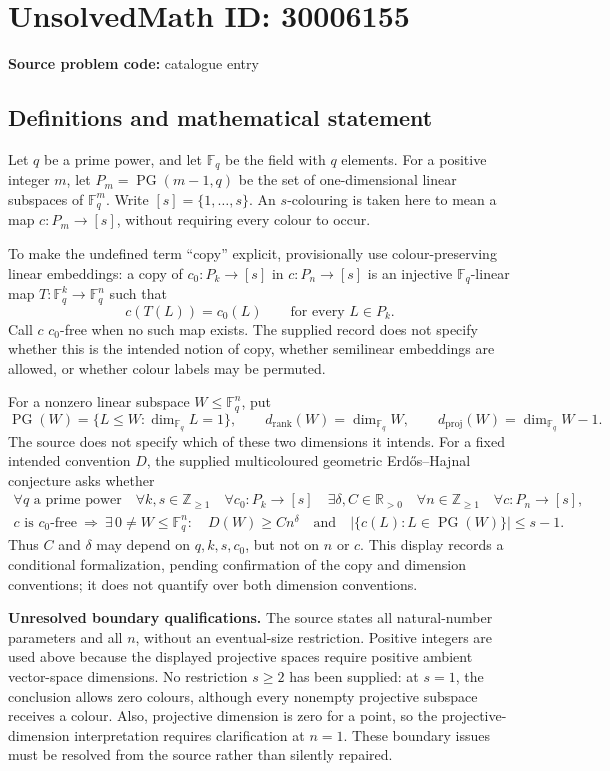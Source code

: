 \documentclass[11pt]{article}
\newcommand{\Z}{\mathbb{Z}}
\newcommand{\R}{\mathbb{R}}
\newcommand{\F}{\mathbb{F}}
\begin{document}
\section*{UnsolvedMath ID: 30006155}
\textbf{Source problem code:} catalogue entry
\subsection{Definitions and mathematical statement}
Let \(q\) be a prime power, and let \(\F_q\) be the field with \(q\) elements. For a positive integer \(m\), let \(P_m=\operatorname{PG}(m-1,q)\) be the set of one-dimensional linear subspaces of \(\F_q^m\). Write \([s]=\{1,\ldots,s\}\). An \(s\)-colouring is taken here to mean a map \(c:P_m\to[s]\), without requiring every colour to occur.

To make the undefined term ``copy'' explicit, provisionally use colour-preserving linear embeddings: a copy of \(c_0:P_k\to[s]\) in \(c:P_n\to[s]\) is an injective \(\F_q\)-linear map \(T:\F_q^k\to\F_q^n\) such that
\[
 c(T(L))=c_0(L)\qquad\text{for every }L\in P_k.
\]
Call \(c\) \(c_0\)-free when no such map exists. The supplied record does not specify whether this is the intended notion of copy, whether semilinear embeddings are allowed, or whether colour labels may be permuted.

For a nonzero linear subspace \(W\le\F_q^n\), put
\[
 \operatorname{PG}(W)=\{L\le W:\dim_{\F_q}L=1\},\qquad
 d_{\mathrm{rank}}(W)=\dim_{\F_q}W,\qquad
 d_{\mathrm{proj}}(W)=\dim_{\F_q}W-1.
\]
The source does not specify which of these two dimensions it intends. For a fixed intended convention \(D\), the supplied multicoloured geometric Erd\H{o}s--Hajnal conjecture asks whether
\[
\begin{gathered}
 \forall q\text{ a prime power}\quad
 \forall k,s\in\Z_{\ge1}\quad
 \forall c_0:P_k\to[s]\quad
 \exists\delta,C\in\R_{>0}\quad
 \forall n\in\Z_{\ge1}\quad
 \forall c:P_n\to[s],\\
 c\text{ is }c_0\text{-free}
 \ \Longrightarrow\
 \exists\,0\ne W\le\F_q^n:
 \quad D(W)\ge Cn^\delta
 \quad\text{and}\quad
 \bigl|\{c(L):L\in\operatorname{PG}(W)\}\bigr|\le s-1.
\end{gathered}
\]
Thus \(C\) and \(\delta\) may depend on \(q,k,s,c_0\), but not on \(n\) or \(c\). This display records a conditional formalization, pending confirmation of the copy and dimension conventions; it does not quantify over both dimension conventions.

\textbf{Unresolved boundary qualifications.} The source states all natural-number parameters and all \(n\), without an eventual-size restriction. Positive integers are used above because the displayed projective spaces require positive ambient vector-space dimensions. No restriction \(s\ge2\) has been supplied: at \(s=1\), the conclusion allows zero colours, although every nonempty projective subspace receives a colour. Also, projective dimension is zero for a point, so the projective-dimension interpretation requires clarification at \(n=1\). These boundary issues must be resolved from the source rather than silently repaired.
\end{document}
